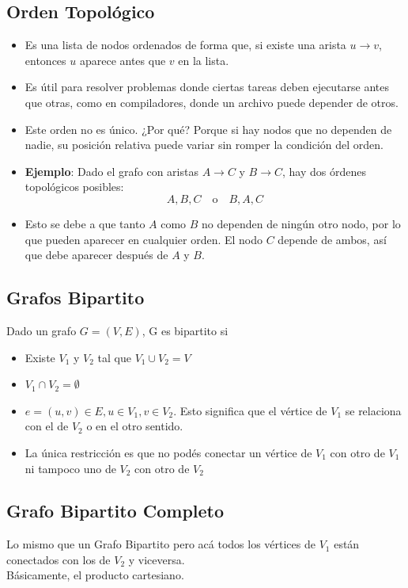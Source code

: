 \documentclass[10pt,a4paper]{article}
\begin{document}
\subsection*{Orden Topológico}
\begin{itemize}
    \item Es una lista de nodos ordenados de forma que, si existe una arista $u \rightarrow v$, entonces $u$ aparece antes que $v$ en la lista.
    \item Es útil para resolver problemas donde ciertas tareas deben ejecutarse antes que otras, como en compiladores, donde un archivo puede depender de otros.
    \item Este orden no es único. ¿Por qué? Porque si hay nodos que no dependen de nadie, su posición relativa puede variar sin romper la condición del orden.
    \item \textbf{Ejemplo}: Dado el grafo con aristas $A \rightarrow C$ y $B \rightarrow C$, hay dos órdenes topológicos posibles: 
    \[
    A, B, C \quad \text{o} \quad B, A, C
    \]
    \item Esto se debe a que tanto $A$ como $B$ no dependen de ningún otro nodo, por lo que pueden aparecer en cualquier orden. El nodo $C$ depende de ambos, así que debe aparecer después de $A$ y $B$.
\end{itemize}
\subsection*{Grafos Bipartito}
Dado un grafo $G = (V, E)$, G es bipartito si
\begin{itemize}
    \item Existe $V_{1}$ y $V_{2}$ tal que $V_{1} \cup V_{2} = V$
    \item $V_{1} \cap V_{2} = \emptyset$
    \item $e = (u,v) \in E, u \in V_{1}, v \in V_{2}$. Esto significa que el vértice de $V_{1}$ se relaciona con el de $V_{2}$ o en el otro sentido. 
    \item La única restricción es que no podés conectar un vértice de $V_{1}$ con otro de $V_{1}$ ni tampoco uno de $V_{2}$ con otro de $V_{2}$
\end{itemize}
\subsection*{Grafo Bipartito Completo}
Lo mismo que un Grafo Bipartito pero acá todos los vértices de $V_{1}$ están conectados con los de $V_{2}$ y viceversa. \\
Básicamente, el producto cartesiano.
\end{document}
